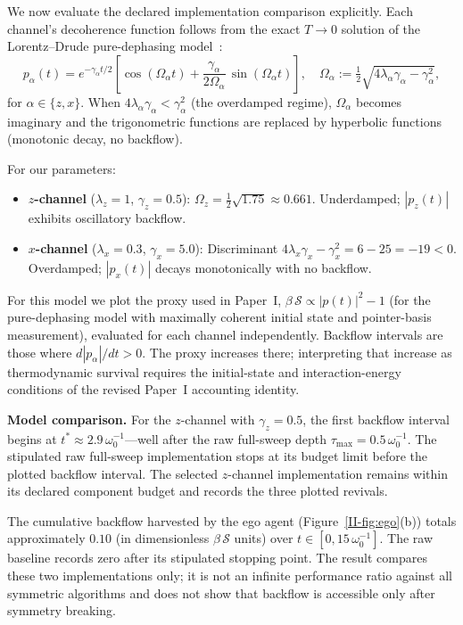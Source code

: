 \documentclass[12pt,a4paper,openany]{book}
\begin{document}
We now evaluate the declared implementation comparison explicitly.
Each channel's decoherence function follows from the exact
$T \to 0$ solution of the Lorentz--Drude pure-dephasing
model~\cite{BreuerPetruccione2002,Liu2026TDOME_I}:
\begin{equation}
\label{II-eq:decoherence_II}
p_\alpha(t) = e^{-\gamma_\alpha t/2}\!\left[
  \cos(\Omega_\alpha t)
  + \frac{\gamma_\alpha}{2\Omega_\alpha}\,
    \sin(\Omega_\alpha t)
\right],
\quad
\Omega_\alpha
:= \tfrac{1}{2}\sqrt{4\lambda_\alpha\gamma_\alpha
   - \gamma_\alpha^2},
\end{equation}
for $\alpha \in \{z, x\}$.
When $4\lambda_\alpha\gamma_\alpha < \gamma_\alpha^2$
(the overdamped regime), $\Omega_\alpha$ becomes imaginary
and the trigonometric functions are replaced by hyperbolic
functions (monotonic decay, no backflow).

For our parameters:
\begin{itemize}
\item \textbf{$z$-channel} ($\lambda_z = 1$,
  $\gamma_z = 0.5$):
  $\Omega_z = \frac{1}{2}\sqrt{1.75} \approx 0.661$.
  Underdamped; $|p_z(t)|$ exhibits oscillatory backflow.
\item \textbf{$x$-channel} ($\lambda_x = 0.3$,
  $\gamma_x = 5.0$):
  Discriminant $4\lambda_x\gamma_x - \gamma_x^2
  = 6 - 25 = -19 < 0$.
  Overdamped; $|p_x(t)|$ decays monotonically with no
  backflow.
\end{itemize}

For this model we plot the proxy used in Paper~I,
$\beta\,\mathcal{S} \propto |p(t)|^2 - 1$
(for the pure-dephasing model with maximally coherent
initial state and pointer-basis measurement), evaluated
for each channel independently.
Backflow intervals are those where $d|p_\alpha|/dt>0$.  The proxy
increases there; interpreting that increase as thermodynamic survival
requires the initial-state and interaction-energy conditions of the
revised Paper~I accounting identity.

\textbf{Model comparison.}
For the $z$-channel with $\gamma_z = 0.5$, the first
backflow interval begins at
$t^* \approx 2.9\,\omega_0^{-1}$---well after the raw
full-sweep depth $\tau_{\max} = 0.5\,\omega_0^{-1}$.
The stipulated raw full-sweep implementation stops at its budget limit
before the plotted backflow interval.  The selected $z$-channel
implementation remains within its declared component budget and records
the three plotted revivals.

The cumulative backflow harvested by the ego agent
(Figure~\ref{II-fig:ego}(b)) totals approximately $0.10$
(in dimensionless $\beta\,\mathcal{S}$ units) over
$t \in [0, 15\,\omega_0^{-1}]$.
The raw baseline records zero after its stipulated stopping point.  The
result compares these two implementations only; it is not an infinite
performance ratio against all symmetric algorithms and does not show
that backflow is accessible only after symmetry breaking.
\end{document}
